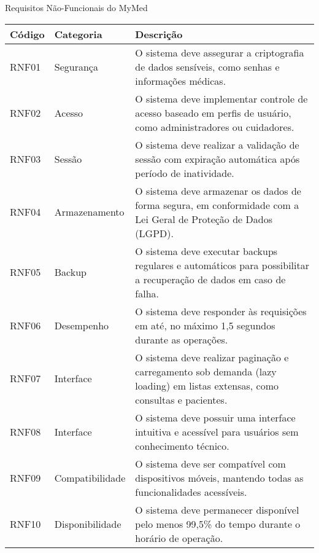 \begin{quadro}
\caption{Requisitos Não-Funcionais do MyMed}
\begin{tabularx}{\textwidth}{|l|l|X|}
\hline
\textbf{Código} & \textbf{Categoria} & \textbf{Descrição} \\ \hline
RNF01 & Segurança & O sistema deve assegurar a criptografia de dados sensíveis, como senhas e informações médicas. \\ \hline
RNF02 & Acesso & O sistema deve implementar controle de acesso baseado em perfis de usuário, como administradores ou cuidadores. \\ \hline
RNF03 & Sessão & O sistema deve realizar a validação de sessão com expiração automática após período de inatividade. \\ \hline
RNF04 & Armazenamento & O sistema deve armazenar os dados de forma segura, em conformidade com a Lei Geral de Proteção de Dados (LGPD). \\ \hline
RNF05 & Backup & O sistema deve executar backups regulares e automáticos para possibilitar a recuperação de dados em caso de falha. \\ \hline
RNF06 & Desempenho & O sistema deve responder às requisições em até, no máximo 1,5 segundos durante as operações. \\ \hline
RNF07 & Interface & O sistema deve realizar paginação e carregamento sob demanda (lazy loading) em listas extensas, como consultas e pacientes. \\ \hline
RNF08 & Interface & O sistema deve possuir uma interface intuitiva e acessível para usuários sem conhecimento técnico. \\ \hline
RNF09 & Compatibilidade & O sistema deve ser compatível com dispositivos móveis, mantendo todas as funcionalidades acessíveis. \\ \hline
RNF10 & Disponibilidade & O sistema deve permanecer disponível pelo menos 99,5\% do tempo durante o horário de operação. \\ \hline
\end{tabularx}
\end{quadro}